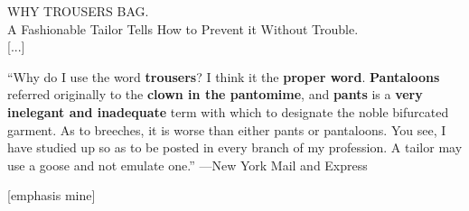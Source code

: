 \begin{ipquote}
{\centering
WHY TROUSERS BAG.\\
A Fashionable Tailor Tells How to Prevent it Without Trouble.\\
{[...]}\\}

{“Why do I use the word \textbf{trousers}? I think it the \textbf{proper word}. \textbf{Pantaloons} referred originally to the \textbf{clown in the pantomime}, and \textbf{pants} is a \textbf{very inelegant and inadequate} term with which to designate the noble bifurcated garment. As to breeches, it is worse than either pants or pantaloons. You see, I have studied up so as to be posted in every branch of my profession. A tailor may use a goose and not emulate one.” —New York Mail and Express

\raggedleft
{[emphasis mine]}\\
}
\end{ipquote}


